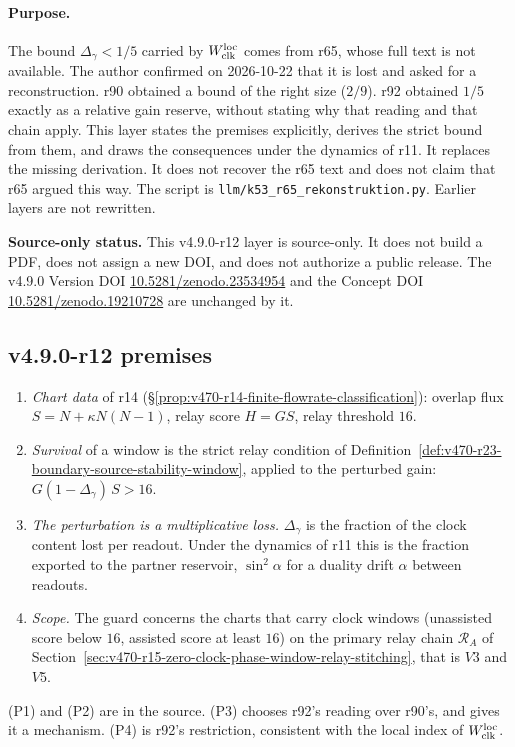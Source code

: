 \paragraph{Purpose.}
The bound \(\Delta_\gamma<1/5\) carried by \(W_{\rm clk}^{\rm loc}\) comes from r65, whose full text is not available.  The
author confirmed on 2026-10-22 that it is lost and asked for a reconstruction.  r90 obtained a bound of the right size
(\(2/9\)).  r92 obtained \(1/5\) exactly as a relative gain reserve, without stating why that reading and that chain apply.
This layer states the premises explicitly, derives the strict bound from them, and draws the consequences under the
dynamics of r11.  It replaces the missing derivation.  It does not recover the r65 text and does not claim that r65 argued
this way.  The script is \texttt{llm/k53\_r65\_rekonstruktion.py}.  Earlier layers are not rewritten.

\noindent\textbf{Source-only status.}
This v4.9.0-r12 layer is source-only.  It does not build a PDF, does not assign a new DOI,
and does not authorize a public release.  The v4.9.0 Version DOI
\href{https://doi.org/10.5281/zenodo.23534954}{10.5281/zenodo.23534954} and the Concept DOI
\href{https://doi.org/10.5281/zenodo.19210728}{10.5281/zenodo.19210728} are unchanged by it.

\subsection*{v4.9.0-r12 premises}
\label{subsec:v490-r12-premises}

\begin{enumerate}[leftmargin=2em]
\item[(P1)] \emph{Chart data} of r14 (\S\ref{prop:v470-r14-finite-flowrate-classification}): overlap flux
\(S=N+\kappa N(N-1)\), relay score \(H=GS\), relay threshold \(16\).
\item[(P2)] \emph{Survival} of a window is the strict relay condition of
Definition~\ref{def:v470-r23-boundary-source-stability-window}, applied to the perturbed gain:
\(G(1-\Delta_\gamma)\,S>16\).
\item[(P3)] \emph{The perturbation is a multiplicative loss.}  \(\Delta_\gamma\) is the fraction of the clock content lost per
readout.  Under the dynamics of r11 this is the fraction exported to the partner reservoir, \(\sin^2\alpha\) for a duality
drift \(\alpha\) between readouts.
\item[(P4)] \emph{Scope.}  The guard concerns the charts that carry clock windows (unassisted score below \(16\), assisted
score at least \(16\)) on the primary relay chain \(\mathcal R_A\) of
Section~\ref{sec:v470-r15-zero-clock-phase-window-relay-stitching}, that is \(V3\) and \(V5\).
\end{enumerate}
(P1) and (P2) are in the source.  (P3) chooses r92's reading over r90's, and gives it a mechanism.  (P4) is r92's
restriction, consistent with the local index of \(W_{\rm clk}^{\rm loc}\).

